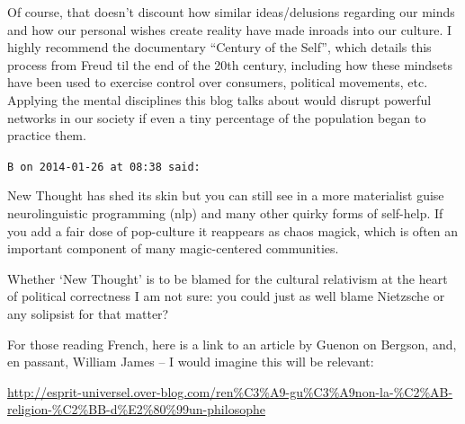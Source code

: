 \begin{footnotesize}
\begin{sffamily}
Of course, that doesn't discount how similar ideas/delusions regarding our minds and how our personal wishes create reality have made inroads into our culture. I highly recommend the documentary ``Century of the Self'', which details this process from Freud til the end of the 20th century, including how these mindsets have been used to exercise control over consumers, political movements, etc. Applying the mental disciplines this blog talks about would disrupt powerful networks in our society if even a tiny percentage of the population began to practice them.

\hfill

\texttt{B on 2014-01-26 at 08:38 said:}

New Thought has shed its skin but you can still see in a more materialist guise neurolinguistic programming (nlp) and many other quirky forms of self-help. If you add a fair dose of pop-culture it reappears as chaos magick, which is often an important component of many magic-centered communities.

Whether `New Thought' is to be blamed for the cultural relativism at the heart of political correctness I am not sure: you could just as well blame Nietzsche or any solipsist for that matter?

For those reading French, here is a link to an article by Guenon on Bergson, and, en passant, William James -- I would imagine this will be relevant:

\url{http://esprit-universel.over-blog.com/ren\%C3\%A9-gu\%C3\%A9non-la-\%C2\%AB-religion-\%C2\%BB-d\%E2\%80\%99un-philosophe}


\end{sffamily}
\end{footnotesize}

